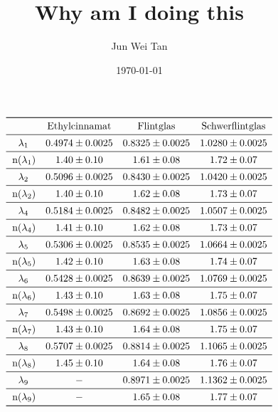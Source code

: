 \documentclass[prb,12pt]{revtex4-2}
\theoremstyle{definition}
\theoremstyle{definition}
\begin{document}
\title{Why am I doing this}
	\author{Jun Wei Tan}
	\date{\today}
	\maketitle

\[
\begin{array}{cccc}
	\toprule
	& \text{Ethylcinnamat} & \text{Flintglas} & \text{Schwerflintglas}\\\midrule
	\lambda _1 & 0.4974\pm 0.0025 & 0.8325\pm 0.0025 & 1.0280\pm 0.0025 \\\midrule
	\left.\text{n(}\lambda _1\right) & 1.40\pm 0.10 & 1.61\pm 0.08 & 1.72\pm 0.07 \\\midrule
	\lambda _2 & 0.5096\pm 0.0025 & 0.8430\pm 0.0025 & 1.0420\pm 0.0025 \\\midrule
	\left.\text{n(}\lambda _2\right) & 1.40\pm 0.10 & 1.62\pm 0.08 & 1.73\pm 0.07 \\\midrule
	\lambda _4 & 0.5184\pm 0.0025 & 0.8482\pm 0.0025 & 1.0507\pm 0.0025 \\\midrule
	\left.\text{n(}\lambda _4\right) & 1.41\pm 0.10 & 1.62\pm 0.08 & 1.73\pm 0.07 \\\midrule
	\lambda _5 & 0.5306\pm 0.0025 & 0.8535\pm 0.0025 & 1.0664\pm 0.0025 \\\midrule
	\left.\text{n(}\lambda _5\right) & 1.42\pm 0.10 & 1.63\pm 0.08 & 1.74\pm 0.07 \\\midrule
	\lambda _6 & 0.5428\pm 0.0025 & 0.8639\pm 0.0025 & 1.0769\pm 0.0025 \\\midrule
	\left.\text{n(}\lambda _6\right) & 1.43\pm 0.10 & 1.63\pm 0.08 & 1.75\pm 0.07 \\\midrule
	\lambda _7 & 0.5498\pm 0.0025 & 0.8692\pm 0.0025 & 1.0856\pm 0.0025 \\\midrule
	\left.\text{n(}\lambda _7\right) & 1.43\pm 0.10 & 1.64\pm 0.08 & 1.75\pm 0.07 \\\midrule
	\lambda _8 & 0.5707\pm 0.0025 & 0.8814\pm 0.0025 & 1.1065\pm 0.0025 \\\midrule
	\left.\text{n(}\lambda _8\right) & 1.45\pm 0.10 & 1.64\pm 0.08 & 1.76\pm 0.07 \\\midrule
	\lambda _9 & - & 0.8971\pm 0.0025 & 1.1362\pm 0.0025 \\\midrule
	\left.\text{n(}\lambda _9\right) & - & 1.65\pm 0.08 & 1.77\pm 0.07 \\\bottomrule
\end{array}
\]
\end{document}
